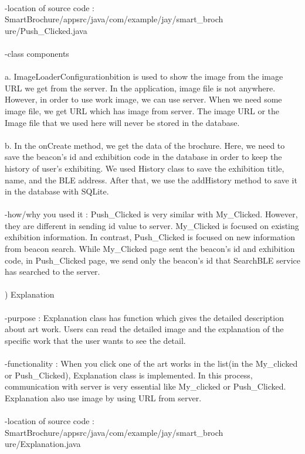 \documentclass[conference]{IEEEtran}
\begin{document}
\\ -location of source code : SmartBrochure/appsrc/java/com/example/jay/smart\_broch
ure/Push\_Clicked.java\\
\\ -class components\\
\\ a. ImageLoaderConfigurationbition is used to show the image from the image URL we get from the server. In the application, image file is not anywhere. However, in order to use work image, we can use server. When we need some image file, we get URL which has image from server. The image URL or the Image file that we used here will never be stored in the database.\\
\\ b. In the onCreate method, we get the data of the brochure. Here, we need to save the beacon’s id and exhibition code in the database in order to keep the history of user’s exhibiting. We used History class to save the exhibition title, name, and the BLE address. After that, we use the addHistory method to save it in the database with SQLite.\\
\\ -how/why you used it : Push\_Clicked is very similar with My\_Clicked. However, they are different in sending id value to server. My\_Clicked is focused on existing exhibition information. In contrast, Push\_Clicked is focused on new information from beacon search. While My\_Clicked page sent the beacon’s id and exhibition code, in Push\_Clicked page, we send only the beacon’s id that SearchBLE service has searched to the server. \\\\
) Explanation\\\\
-purpose : Explanation class has function which gives the detailed description about art work. Users can read the detailed image and the explanation of the specific work that the user wants to see the detail.\\
\\ -functionality : When you click one of the art works in the list(in the My\_clicked or Push\_Clicked), Explanation class is implemented. In this process, communication with server is very essential like My\_clicked or Push\_Clicked. Explanation also use image by using URL from server.\\
\\ -location of source code : SmartBrochure/appsrc/java/com/example/jay/smart\_broch
ure/Explanation.java\\
\end{document}
